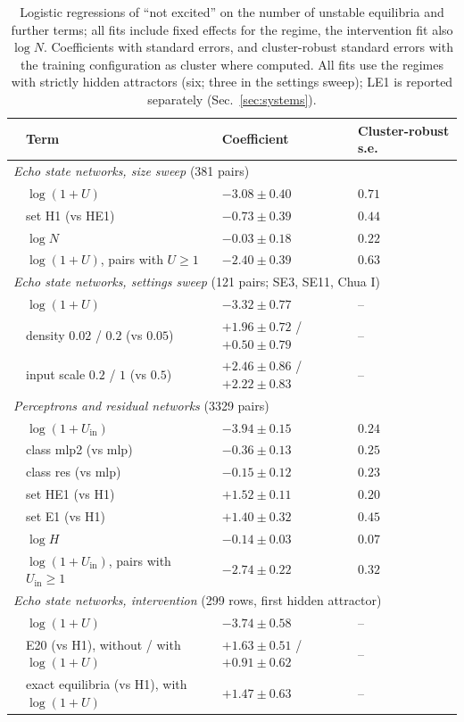 \begin{table}
\caption{Logistic regressions of ``not excited'' on the number of unstable equilibria and further terms; all fits include
fixed effects for the regime, the intervention fit also $\log N$. Coefficients with standard errors, and cluster-robust
standard errors with the training configuration as cluster where computed. All fits use the regimes with strictly hidden
attractors (six; three in the settings sweep); LE1 is reported separately (Sec.~\ref{sec:systems}).}
\label{tab:regressions}
\begin{ruledtabular}
\begin{tabular}{llll}
 & Term & Coefficient & Cluster-robust s.e. \\
\hline
\multicolumn{4}{l}{\emph{Echo state networks, size sweep} (381 pairs)} \\
 & $\log(1+U)$ & $-3.08\pm0.40$ & $0.71$ \\
 & set H1 (vs HE1) & $-0.73\pm0.39$ & $0.44$ \\
 & $\log N$ & $-0.03\pm0.18$ & $0.22$ \\
 & $\log(1+U)$, pairs with $U\ge1$ & $-2.40\pm0.39$ & $0.63$ \\
\multicolumn{4}{l}{\emph{Echo state networks, settings sweep} (121 pairs; SE3, SE11, Chua I)} \\
 & $\log(1+U)$ & $-3.32\pm0.77$ & -- \\
 & density $0.02$ / $0.2$ (vs $0.05$) & $+1.96\pm0.72$ / $+0.50\pm0.79$ & -- \\
 & input scale $0.2$ / $1$ (vs $0.5$) & $+2.46\pm0.86$ / $+2.22\pm0.83$ & -- \\
\multicolumn{4}{l}{\emph{Perceptrons and residual networks} (3329 pairs)} \\
 & $\log(1+U_{\mathrm{in}})$ & $-3.94\pm0.15$ & $0.24$ \\
 & class mlp2 (vs mlp) & $-0.36\pm0.13$ & $0.25$ \\
 & class res (vs mlp) & $-0.15\pm0.12$ & $0.23$ \\
 & set HE1 (vs H1) & $+1.52\pm0.11$ & $0.20$ \\
 & set E1 (vs H1) & $+1.40\pm0.32$ & $0.45$ \\
 & $\log H$ & $-0.14\pm0.03$ & $0.07$ \\
 & $\log(1+U_{\mathrm{in}})$, pairs with $U_{\mathrm{in}}\ge1$ & $-2.74\pm0.22$ & $0.32$ \\
\multicolumn{4}{l}{\emph{Echo state networks, intervention} (299 rows, first hidden attractor)} \\
 & $\log(1+U)$ & $-3.74\pm0.58$ & -- \\
 & E20 (vs H1), without / with $\log(1+U)$ & $+1.63\pm0.51$ / $+0.91\pm0.62$ & -- \\
 & exact equilibria (vs H1), with $\log(1+U)$ & $+1.47\pm0.63$ & -- \\
\end{tabular}
\end{ruledtabular}
\end{table}
